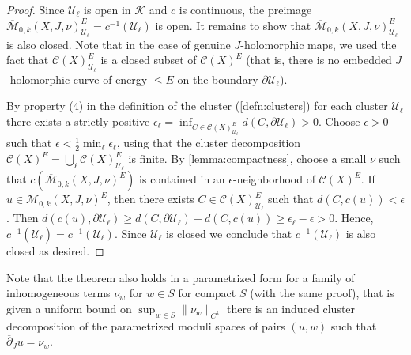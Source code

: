 \documentclass[reqno]{amsart}
\numberwithin{equation}{section}
\numberwithin{equation}{section}
\numberwithin{equation}{section}
\newtheorem{lemma}[thm]{Lemma}
\theoremstyle{definition}
\theoremstyle{remark}
\theoremstyle{remark}
\newcommand{\ov}{\overline}
\begin{document}
\begin{proof}
    Since $\mathcal{U}_\ell$ is open in $\mathcal{K}$ and $c$ is continuous, the preimage $\ov{\mathcal{M}}_{0,k}(X,J, \nu)_{\mathcal{U}_\ell}^E = c^{-1}(\mathcal{U}_\ell)$ is open. It remains to show that $\ov{\mathcal{M}}_{0,k}(X,J, \nu)_{\mathcal{U}_\ell}^E $ is also closed. Note that in the case of genuine $J$-holomorphic maps, we used the fact that $\mathcal{C}(X)^E_{\mathcal{U}_\ell}$ is a closed subset of $\mathcal{C}(X)^E$ (that is, there is no embedded $J$-holomorphic curve of energy $\leq E$ on the boundary $\partial \mathcal{U}_\ell$). 

    By property (4) in the definition of the cluster (\cref{defn:clusters}) for each cluster $\mathcal{U}_\ell$ there exists a strictly positive $\epsilon_\ell = \inf_{C \in \mathcal{C}(X)^{E}_{\mathcal{U}_\ell}} d (C, \partial \mathcal{U}_\ell) > 0$. Choose $\epsilon>0$ such that $\epsilon < \frac{1}{2} \min_\ell \epsilon_\ell$, using that the cluster decomposition $\mathcal{C}(X)^E = \bigcup_\ell \mathcal{C}(X)^E_{\mathcal{U}_\ell}$ is finite. By \cref{lemma:compactness}, choose a small $\nu$ such that $c(\ov{\mathcal{M}}_{0,k}(X,J, \nu)^E)$ is contained in an $\epsilon$-neighborhood of $\mathcal{C}(X)^E$. If $u \in \ov{\mathcal{M}}_{0,k}(X,J, \nu)^E$, then there exists $C \in \mathcal{C}(X)^E_{\mathcal{U}_\ell}$ such that $d(C,c(u)) < \epsilon$. Then $ d(c(u), \partial \mathcal{U}_\ell) \ge d(C, \partial \mathcal{U}_\ell) - d(C, c(u)) \ge \epsilon_\ell - \epsilon > 0$. Hence, $c^{-1}(\ov{\mathcal{U}_\ell}) = c^{-1}(\mathcal{U}_\ell)$. Since $\ov{\mathcal{U}_\ell}$ is closed we conclude that $c^{-1}(\mathcal{U}_\ell)$ is also closed as desired.
\end{proof}

Note that the theorem also holds in a parametrized form for a family of inhomogeneous terms $\nu_w$ for $w \in S$ for compact $S$ (with the same proof), that is given a uniform bound on $\sup_{w \in S} \|\nu_w\|_{C^k}$ there is an induced cluster decomposition of the parametrized moduli spaces of pairs $(u, w)$ such that $\ov{\partial}_J u = \nu_w$.
\end{document}
